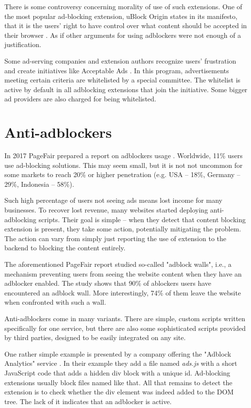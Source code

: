 There is some controversy concerning morality of use of such extensions.
One of the most popular ad-blocking extension, uBlock Origin states in its manifesto,
that it is the users' right to have control over what content should be accepted in their browser \cite{ublock:manifesto}.
As if other arguments for using adblockers were not enough of a justification.

Some ad-serving companies and extension authors 
recognize users' frustration and create initiatives like Acceptable Ads \cite{acceptableads}.
In this program, advertisements meeting certain criteria are whitelisted by a special committee.
The whitelist is active by default in all adblocking extensions that join the initiative.
Some bigger ad providers are also charged for being whitelisted.


\section{Anti-adblockers}
\label{anti-adblockers}

In 2017 PageFair prepared a report on adblockers usage \cite{pagefair:adblock-report}.
Worldwide, 11\% users use ad-blocking solutions. This may seem small, but it is not not uncommon
for some markets to reach 20\% or higher penetration (e.g. USA -- 18\%, Germany -- 29\%, Indonesia -- 58\%).

Such high percentage of users not seeing ads means lost income for many businesses.
To recover lost revenue, many websites started deploying anti-adblocking scripts.
Their goal is simple -- when they detect that content blocking extension is present, 
they take some action, potentially mitigating the problem.
The action can vary from simply just reporting the use of extension to the backend to blocking 
the content entirely.

The aforementioned PageFair report studied so-called "adblock walls", i.e., a mechanism
preventing users from seeing the website content when they have an adblocker enabled.
The study shows that 90\% of ablockers users have encountered an adblock wall.
More interestingly, 74\% of them leave the website when confronted with such a wall.

Anti-adblockers come in many variants. There are simple, custom scripts written 
specifically for one service, but there are also some sophisticated scripts 
provided by third parties, designed to be easily integrated on any site.

One rather simple example is presented by a company offering the "Adblock Analytics" service \cite{detect-adblock}.
In their example they add a file named \emph{ads.js} with a short JavaScript code that adds a hidden div block with a unique id.
Ad-blocking extensions usually block files named like that. All that remains to detect the extension is to
check whether the div element was indeed added to the DOM tree. 
The lack of it indicates that an adblocker is active.

